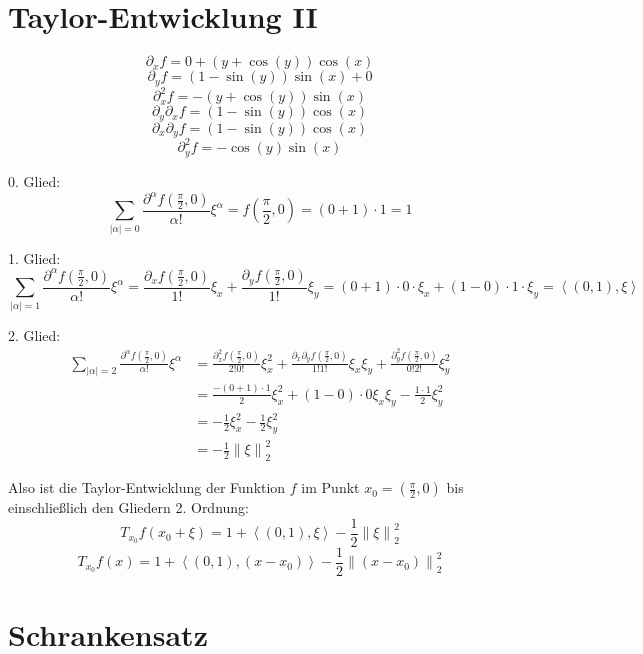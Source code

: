 \documentclass[sectionformat=aufgabe]{gadsescript}
\begin{document}
\section{Taylor-Entwicklung II}
\[
	\partial_x f = 0 + (y + \cos (y)) \cos (x)
\]
\[
	\partial_y f = (1 - \sin (y)) \sin (x) + 0
\]
\[
	\partial_x^2 f = - (y + \cos (y)) \sin (x)
\]
\[
	\partial_y\partial_x f = (1 - \sin (y)) \cos (x)
\]
\[
	\partial_x\partial_y f = (1 - \sin (y)) \cos (x)
\]
\[
	\partial_y^2 f = - \cos (y) \sin (x)
\]

0. Glied:
\[
	\sum_{\left| \alpha \right| = 0}^{} \frac{ \partial^{\alpha} f\left( \frac{ \pi }{ 2 } , 0 \right)  }{ \alpha! } \xi^{\alpha} = f\left( \frac{ \pi }{ 2 } , 0 \right)  = (0 + 1) \cdot 1 = 1
\]

1. Glied:
\[
	\sum_{\left| \alpha \right| = 1}^{} \frac{ \partial^{\alpha} f\left( \frac{ \pi }{ 2 } , 0 \right)  }{ \alpha! } \xi^{\alpha}
	= \frac{ \partial_x f\left( \frac{ \pi }{ 2 } , 0 \right) }{ 1! } \xi_x
	+ \frac{ \partial_y f\left( \frac{ \pi }{ 2 } , 0 \right) }{ 1! } \xi_y
	= (0 + 1) \cdot 0 \cdot \xi_x + (1 - 0) \cdot 1 \cdot \xi_y = \left< (0, 1), \xi \right>
\]

2. Glied:
\begin{align*}
	\sum_{\left| \alpha \right| = 2}^{} \frac{ \partial^{\alpha} f\left( \frac{ \pi }{ 2 } , 0 \right)  }{ \alpha! } \xi^{\alpha}
	&= \frac{ \partial_x^2 f\left( \frac{ \pi }{ 2 } , 0 \right) }{ 2!0! } \xi_x^2
	+ \frac{ \partial_x\partial_y f\left( \frac{ \pi }{ 2 } , 0 \right) }{ 1!1! } \xi_x\xi_y
	+ \frac{ \partial_y^2 f\left( \frac{ \pi }{ 2 } , 0 \right) }{ 0!2! } \xi_y^2 \\
	&= \frac{ - (0 + 1) \cdot 1 }{ 2 } \xi_x^2 + (1 - 0) \cdot 0 \xi_x\xi_y - \frac{ 1 \cdot 1 }{ 2 } \xi_y^2 \\
	&= -\frac{ 1 }{ 2 } \xi_x^2 - \frac{ 1 }{ 2 } \xi_y^2 \\
	&= - \frac{ 1 }{ 2 } \left\| \xi \right\| _2^2
\end{align*}

Also ist die Taylor-Entwicklung der Funktion $ f $ im Punkt $ x_0 = \left( \frac{ \pi }{ 2 } , 0 \right)  $ bis einschließlich den Gliedern 2. Ordnung:
\[
	T_{x_0} f(x_0 + \xi) = 1 + \left< (0, 1), \xi \right> - \frac{ 1 }{ 2 } \left\| \xi \right\| _2^2
\]
\[
	T_{x_0} f(x) = 1 + \left< (0, 1), (x - x_0) \right> - \frac{ 1 }{ 2 } \left\| (x - x_0) \right\| _2^2
\]

\section{Schrankensatz}
\end{document}

